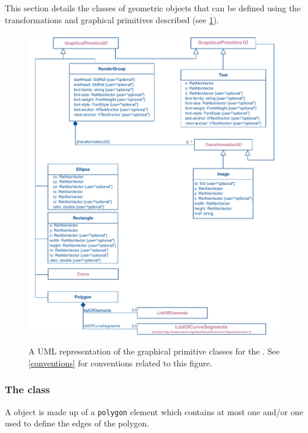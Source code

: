 This section details the classes of geometric objects that can be defined using 
the transformations and graphical primitives described (see \ref{fig:group_render_uml}).

\begin{figure}[!htp]
  \centering
  \includegraphics{images/render-group-uml}\\
  \caption{A UML representation of the graphical primitive classes for the \RenderPackage.  See \ref{conventions} for conventions related to this figure. }
  \label{fig:group_render_uml}
\end{figure}
\pagebreak


\subsubsection{The  class}
\label{polygon-class}

A \Polygon object is made up of a \texttt{polygon} element which contains at most one 
\ListOfElements and/or one  used to define the edges of the polygon.

